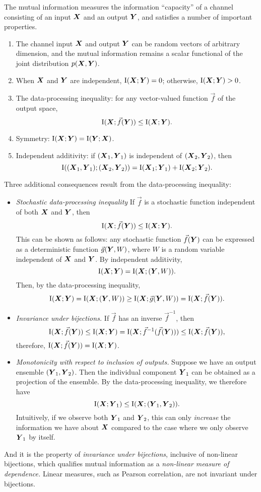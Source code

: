 \documentclass[12pt]{article}
\begin{document}
The mutual information measures the information ``capacity'' of a
channel consisting of an input $\boldsymbol{X}$ and an output $\boldsymbol{Y}$, and
satisfies a number of important properties.
\begin{enumerate}
\item The channel input $\boldsymbol{X}$ and output $\boldsymbol{Y}$ can be random vectors of arbitrary dimension, and the mutual information remains a scalar functional of the joint distribution $p(\boldsymbol{X}, \boldsymbol{Y})$.
\item When $\boldsymbol{X}$ and $\boldsymbol{Y}$ are independent, $\text{I}(\boldsymbol{X}; \boldsymbol{Y}) = 0$; otherwise, $\text{I}(\boldsymbol{X}; \boldsymbol{Y}) > 0$.
\item The data-processing inequality: for any vector-valued function $\vec{f}$ of the output space,
\[
\text{I}(\boldsymbol{X}; \vec{f}(\boldsymbol{Y})) \leq \text{I}(\boldsymbol{X}; \boldsymbol{Y}).
\]
\item Symmetry: $\text{I}(\boldsymbol{X}; \boldsymbol{Y}) = \text{I}(\boldsymbol{Y}; \boldsymbol{X})$.
\item Independent additivity: if $(\boldsymbol{X}_1,\boldsymbol{Y}_1)$ is independent of $(\boldsymbol{X}_2, \boldsymbol{Y}_2)$, then
\[
\text{I}((\boldsymbol{X}_1,\boldsymbol{Y}_1); (\boldsymbol{X}_2, \boldsymbol{Y}_2)) = \text{I}(\boldsymbol{X}_1; \boldsymbol{Y}_1) + \text{I}(\boldsymbol{X}_2; \boldsymbol{Y}_2).
\]
\end{enumerate}
Three additional consequences result from the data-processing inequality:
\begin{itemize}
\item \emph{Stochastic data-processing inequality}  If $\vec{f}$ is a stochastic function independent of both $\boldsymbol{X}$ and $\boldsymbol{Y}$, then
\[
\text{I}(\boldsymbol{X}; \vec{f}(\boldsymbol{Y})) \leq \text{I}(\boldsymbol{X}; \boldsymbol{Y}).
\]
This can be shown as follows: any stochastic function $\vec{f}(\boldsymbol{Y})$
can be expressed as a deterministic function $\vec{g}(\boldsymbol{Y}, W)$, where
$W$ is a random variable independent of $\boldsymbol{X}$ and $\boldsymbol{Y}$.
By independent additivity,
\[
\text{I}(\boldsymbol{X}; \boldsymbol{Y}) = \text{I}(\boldsymbol{X}; (\boldsymbol{Y}, W)).
\]
Then, by the data-processing inequality,
\[
\text{I}(\boldsymbol{X}; \boldsymbol{Y}) = \text{I}(\boldsymbol{X}; (\boldsymbol{Y}, W)) \geq \text{I}(\boldsymbol{X}; \vec{g}(\boldsymbol{Y}, W)) = \text{I}(\boldsymbol{X}; \vec{f}(\boldsymbol{Y})).
\]
\item \emph{Invariance under bijections.} If $\vec{f}$ has an inverse $\vec{f}^{-1}$, then 
\[
\text{I}(\boldsymbol{X}; \vec{f}(\boldsymbol{Y})) \leq \text{I}(\boldsymbol{X}; \boldsymbol{Y}) = \text{I}(\boldsymbol{X}; \vec{f}^{-1}(\vec{f}(\boldsymbol{Y}))) \leq \text{I}(\boldsymbol{X}; \vec{f}(\boldsymbol{Y})),
\]
therefore, $\text{I}(\boldsymbol{X}; \vec{f}(\boldsymbol{Y})) = \text{I}(\boldsymbol{X}; \boldsymbol{Y})$.
\item \emph{Monotonicity with respect to inclusion of outputs.}  Suppose we have an output ensemble $(\boldsymbol{Y}_1,\boldsymbol{Y}_2)$.  Then the individual component $\boldsymbol{Y}_1$ can be obtained as a projection of the ensemble.  By the data-processing inequality, we therefore have
\[
\text{I}(\boldsymbol{X}; \boldsymbol{Y}_1) \leq \text{I}(\boldsymbol{X}; (\boldsymbol{Y}_1, \boldsymbol{Y}_2)).
\]
Intuitively, if we observe both $\boldsymbol{Y}_1$ and $\boldsymbol{Y}_2$, this can
only \emph{increase} the information we have about $\boldsymbol{X}$ compared to
the case where we only observe $\boldsymbol{Y}_1$ by itself.
\end{itemize}
And it is the property of \emph{invariance under bijections},
inclusive of non-linear bijections, which qualifies mutual information
as a \emph{non-linear measure of dependence.}  Linear measures, such
as Pearson correlation, are not invariant under bijections.  
\end{document}
